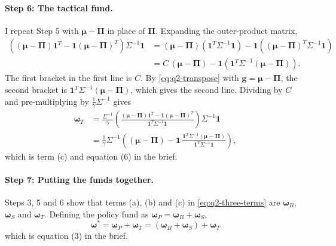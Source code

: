 \documentclass[11pt]{article}
\numberwithin{equation}{section}
\begin{document}
\paragraph{Step 6: The tactical fund.}
I repeat Step 5 with $\bm{\mu} - \bm{\Pi}$ in place of $\bm{\Pi}$. Expanding the outer-product matrix,
\begin{align*}
  \left((\bm{\mu} - \bm{\Pi})\mathbf{1}^{T} - \mathbf{1}(\bm{\mu} - \bm{\Pi})^{T}\right)\Sigma^{-1}\mathbf{1}
  &= (\bm{\mu} - \bm{\Pi})\left(\mathbf{1}^{T}\Sigma^{-1}\mathbf{1}\right) - \mathbf{1}\left((\bm{\mu} - \bm{\Pi})^{T}\Sigma^{-1}\mathbf{1}\right) \\
  &= C\,(\bm{\mu} - \bm{\Pi}) - \mathbf{1}\left(\mathbf{1}^{T}\Sigma^{-1}(\bm{\mu} - \bm{\Pi})\right).
\end{align*}
The first bracket in the first line is $C$. By \eqref{eq:q2-transpose} with $\mathbf{g} = \bm{\mu} - \bm{\Pi}$, the second bracket is $\mathbf{1}^{T}\Sigma^{-1}(\bm{\mu} - \bm{\Pi})$, which gives the second line.
Dividing by $C$ and pre-multiplying by $\frac{1}{\gamma}\Sigma^{-1}$ gives
\begin{equation}
  \begin{split}
  \bm{\omega}_{T}
  &= \frac{\Sigma^{-1}}{\gamma}\left(\frac{(\bm{\mu} - \bm{\Pi})\mathbf{1}^{T} - \mathbf{1}(\bm{\mu} - \bm{\Pi})^{T}}{\mathbf{1}^{T}\Sigma^{-1}\mathbf{1}}\right)\Sigma^{-1}\mathbf{1} \\
  &= \frac{1}{\gamma}\Sigma^{-1}\left((\bm{\mu} - \bm{\Pi}) - \mathbf{1}\,\frac{\mathbf{1}^{T}\Sigma^{-1}(\bm{\mu} - \bm{\Pi})}{\mathbf{1}^{T}\Sigma^{-1}\mathbf{1}}\right),
  \end{split}
  \label{eq:q2-wT}
\end{equation}
which is term (c) and equation (6) in the brief.

\paragraph{Step 7: Putting the funds together.}
Steps 3, 5 and 6 show that terms (a), (b) and (c) in \eqref{eq:q2-three-terms} are $\bm{\omega}_{B}$, $\bm{\omega}_{S}$ and $\bm{\omega}_{T}$. Defining the policy fund as $\bm{\omega}_{P} = \bm{\omega}_{B} + \bm{\omega}_{S}$,
\begin{equation}
  \boxed{\;\bm{\omega}^{*} = \bm{\omega}_{P} + \bm{\omega}_{T} = \left(\bm{\omega}_{B} + \bm{\omega}_{S}\right) + \bm{\omega}_{T}\;}
  \label{eq:q2-result}
\end{equation}
which is equation (3) in the brief.
\end{document}
